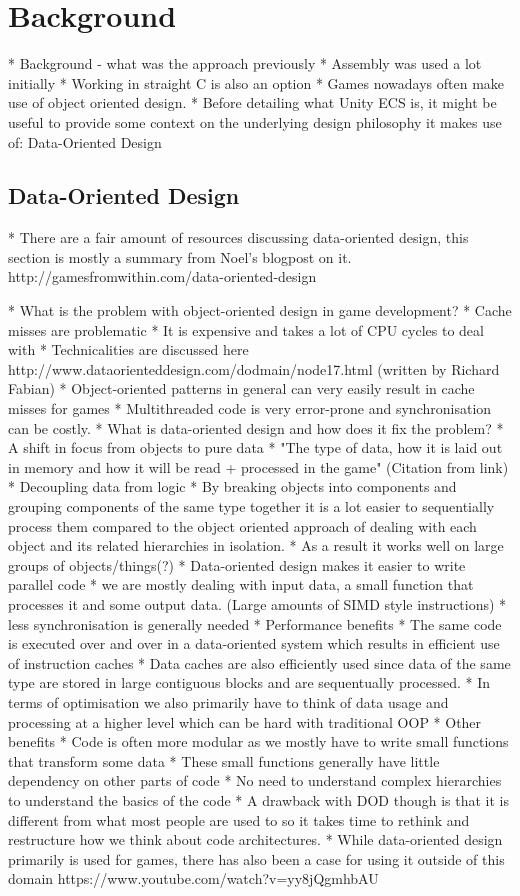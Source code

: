 \chapter{Background}
* Background - what was the approach previously
  * Assembly was used a lot initially
  * Working in straight C is also an option
  * Games nowadays often make use of object oriented design.
* Before detailing what Unity ECS is, it might be useful to provide some context on the underlying design philosophy it makes use of: Data-Oriented Design

\section{Data-Oriented Design}
* There are a fair amount of resources discussing data-oriented design, this section is mostly a summary from Noel's blogpost on it. http://gamesfromwithin.com/data-oriented-design

* What is the problem with object-oriented design in game development?
   * Cache misses are problematic
      * It is expensive and takes a lot of CPU cycles to deal with
      * Technicalities are discussed here http://www.dataorienteddesign.com/dodmain/node17.html (written by Richard Fabian)
      * Object-oriented patterns in general can very easily result in cache misses for games
   * Multithreaded code is very error-prone and synchronisation can be costly. 
* What is data-oriented design and how does it fix the problem? 
   * A shift in focus from objects to pure data
      * "The type of data, how it is laid out in memory and how it will be read + processed in the game" (Citation from link)
      * Decoupling data from logic
   * By breaking objects into components and grouping components of the same type together it is a lot easier to sequentially process them compared to the object oriented approach of dealing with each object and its related hierarchies in isolation. 
   * As a result it works well on large groups of objects/things(?)
   * Data-oriented design makes it easier to write parallel code
      * we are mostly dealing with input data, a small function that processes it and some output data. (Large amounts of SIMD style instructions)
      * less synchronisation is generally needed
   * Performance benefits
    * The same code is executed over and over in a data-oriented system which results in efficient use of instruction caches
    * Data caches are also efficiently used since data of the same type are stored in large contiguous blocks and are sequentually processed. 
    * In terms of optimisation we also primarily have to think of data usage and processing at a higher level which can be hard with traditional OOP
   * Other benefits
    * Code is often more modular as we mostly have to write small functions that transform some data
       * These small functions generally have little dependency on other parts of code
       * No need to understand complex hierarchies to understand the basics of the code
   * A drawback with DOD though is that it is different from what most people are used to so it takes time to rethink and restructure how we think about code architectures. 
   * While data-oriented design primarily is used for games, there has also been a case for using it outside of this domain https://www.youtube.com/watch?v=yy8jQgmhbAU
